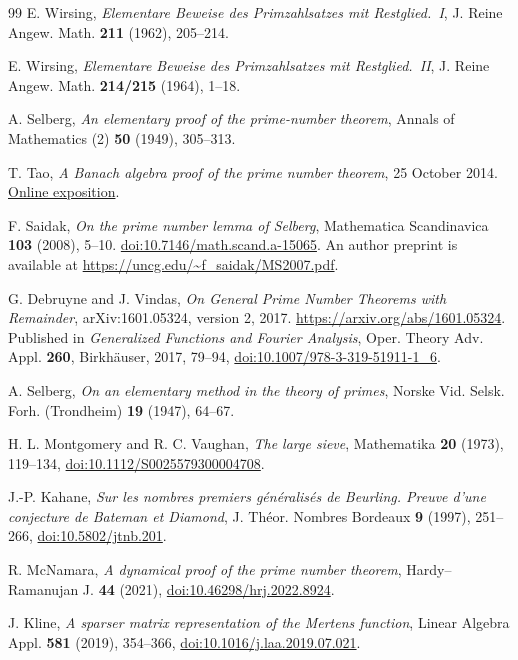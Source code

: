 \documentclass[11pt,letterpaper]{article}
\numberwithin{equation}{section}
\theoremstyle{definition}
\theoremstyle{remark}
\begin{document}
\begin{thebibliography}{99}
E. Wirsing,
\emph{Elementare Beweise des Primzahlsatzes mit Restglied.~I},
J. Reine Angew. Math. \textbf{211} (1962), 205--214.

E. Wirsing,
\emph{Elementare Beweise des Primzahlsatzes mit Restglied.~II},
J. Reine Angew. Math. \textbf{214/215} (1964), 1--18.

A. Selberg,
\emph{An elementary proof of the prime-number theorem},
Annals of Mathematics (2) \textbf{50} (1949), 305--313.

T. Tao,
\emph{A Banach algebra proof of the prime number theorem},
25 October 2014.
\href{https://terrytao.wordpress.com/2014/10/25/a-banach-algebra-proof-of-the-prime-number-theorem/}
{Online exposition}.

F. Saidak,
\emph{On the prime number lemma of Selberg},
Mathematica Scandinavica \textbf{103} (2008), 5--10.
\href{https://doi.org/10.7146/math.scand.a-15065}
{doi:10.7146/math.scand.a-15065}.
An author preprint is available at
\url{https://uncg.edu/~f_saidak/MS2007.pdf}.

G. Debruyne and J. Vindas,
\emph{On General Prime Number Theorems with Remainder},
arXiv:1601.05324, version 2, 2017.
\url{https://arxiv.org/abs/1601.05324}.
Published in \emph{Generalized Functions and Fourier Analysis}, Oper. Theory
Adv. Appl. \textbf{260}, Birkh\"auser, 2017, 79--94,
\href{https://doi.org/10.1007/978-3-319-51911-1_6}{doi:10.1007/978-3-319-51911-1\_6}.

A. Selberg,
\emph{On an elementary method in the theory of primes},
Norske Vid. Selsk. Forh. (Trondheim) \textbf{19} (1947), 64--67.

H. L. Montgomery and R. C. Vaughan,
\emph{The large sieve},
Mathematika \textbf{20} (1973), 119--134,
\href{https://doi.org/10.1112/S0025579300004708}{doi:10.1112/S0025579300004708}.

J.-P. Kahane,
\emph{Sur les nombres premiers g\'en\'eralis\'es de Beurling. Preuve d'une
conjecture de Bateman et Diamond},
J. Th\'eor. Nombres Bordeaux \textbf{9} (1997), 251--266,
\href{https://doi.org/10.5802/jtnb.201}{doi:10.5802/jtnb.201}.

R. McNamara,
\emph{A dynamical proof of the prime number theorem},
Hardy--Ramanujan J. \textbf{44} (2021),
\href{https://doi.org/10.46298/hrj.2022.8924}{doi:10.46298/hrj.2022.8924}.

J. Kline,
\emph{A sparser matrix representation of the Mertens function},
Linear Algebra Appl. \textbf{581} (2019), 354--366,
\href{https://doi.org/10.1016/j.laa.2019.07.021}{doi:10.1016/j.laa.2019.07.021}.


\end{thebibliography}
\end{document}
